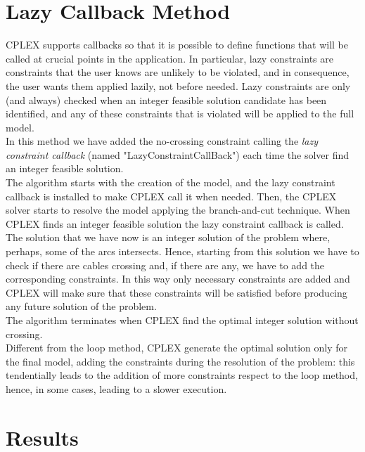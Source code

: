 \section{Lazy Callback Method}
\textsc{CPLEX} supports callbacks so that it is possible to define functions that will be called at crucial points in the application. In particular, lazy constraints are constraints that the user knows are unlikely to be violated, and in consequence, the user
wants them applied lazily, not before needed. Lazy constraints are only (and always) checked when an integer feasible solution candidate has been identified, and any of these constraints that is violated will be applied to the full model. \\
In this method we have added the no-crossing constraint calling the \textit{lazy constraint callback} (named "LazyConstraintCallBack") each time the solver find an integer feasible solution. \\
The algorithm starts with the creation of the model, and the lazy constraint callback is installed to make \textsc{CPLEX} call it when needed. Then, the \textsc{CPLEX} solver starts to resolve the model applying the branch-and-cut technique. When \textsc{CPLEX} finds an integer feasible solution the lazy constraint callback is called. The solution that we have now is an integer solution of the problem where, perhaps, some of
the arcs intersects. Hence, starting from this solution we have to check if there are cables crossing and, if there are any, we have to add the corresponding constraints. In this way only necessary constraints are added and \textsc{CPLEX} will make sure that these constraints will be satisfied before producing any future solution of the problem.\\
The algorithm terminates when \textsc{CPLEX} find the optimal integer solution without crossing. \\
Different from the loop method, \textsc{CPLEX} generate the optimal solution only for the final model, adding the constraints during the resolution of the problem: this tendentially leads to the addition of more constraints respect to the loop method, hence, in some cases, leading to a slower execution.

\section{Results}
